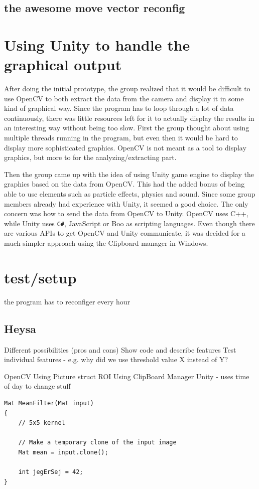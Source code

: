 \subsection{the awesome move vector reconfig}

\section{Using Unity to handle the graphical output}\label{unityStart}
After doing the initial prototype, the group realized that it would be difficult to use OpenCV to both extract the data from the camera and display it in some kind of graphical way. Since the program has to loop through a lot of data continuously, there was little resources left for it to actually display the results in an interesting way without being too slow. First the group thought about using multiple threads running in the program, but even then it would be hard to display more sophisticated graphics. OpenCV is not meant as a tool to display graphics, but more to for the analyzing/extracting part.

Then the group came up with the idea of using Unity game engine to display the graphics based on the data from OpenCV. This had the added bonus of being able to use elements such as particle effects, physics and sound. Since some group members already had experience with Unity, it seemed a good choice. The only concern was how to send the data from OpenCV to Unity. OpenCV uses C++, while Unity uses \texttt{C\#}, JavaScript or Boo as scripting languages. Even though there are various APIs to get OpenCV and Unity communicate, it was decided for a much simpler approach using the Clipboard manager in Windows.

\section{test/setup}
the program has to reconfiger every hour

\subsection{Heysa}
Different possibilities (pros and cons)
Show code and describe features
Test individual features - e.g. why did we use threshold value X instead of Y?

OpenCV
Using Picture struct
ROI
Using ClipBoard Manager
Unity - uses time of day to change stuff

\begin{lstlisting}
Mat MeanFilter(Mat input)
{
	// 5x5 kernel

	// Make a temporary clone of the input image
	Mat mean = input.clone();

	int jegErSej = 42;
}
\end{lstlisting}


